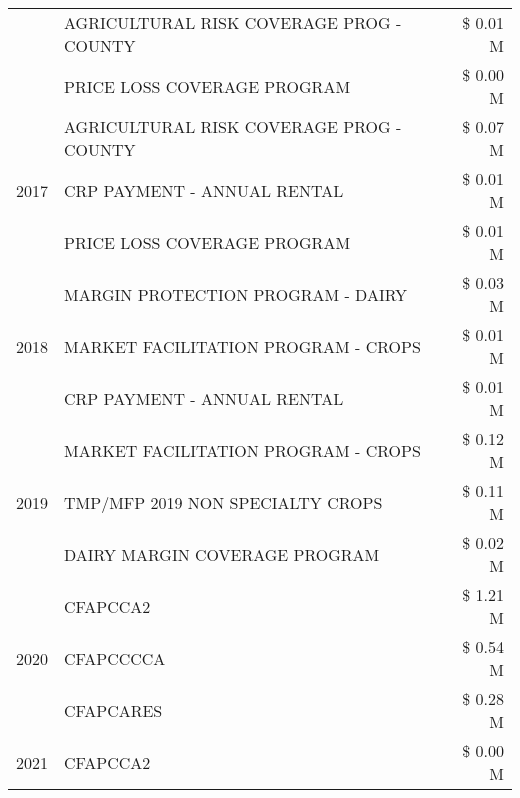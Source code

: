\begin{tabular}{llr}
 & AGRICULTURAL RISK COVERAGE PROG - COUNTY & \$ 0.01 M \\
 & PRICE LOSS COVERAGE PROGRAM & \$ 0.00 M \\
\cline{1-3}
\multirow[t]{3}{*}{2017} & AGRICULTURAL RISK COVERAGE PROG - COUNTY & \$ 0.07 M \\
 & CRP PAYMENT - ANNUAL RENTAL & \$ 0.01 M \\
 & PRICE LOSS COVERAGE PROGRAM & \$ 0.01 M \\
\cline{1-3}
\multirow[t]{3}{*}{2018} & MARGIN PROTECTION PROGRAM - DAIRY & \$ 0.03 M \\
 & MARKET FACILITATION PROGRAM - CROPS & \$ 0.01 M \\
 & CRP PAYMENT - ANNUAL RENTAL & \$ 0.01 M \\
\cline{1-3}
\multirow[t]{3}{*}{2019} & MARKET FACILITATION PROGRAM - CROPS & \$ 0.12 M \\
 & TMP/MFP 2019 NON SPECIALTY CROPS & \$ 0.11 M \\
 & DAIRY MARGIN COVERAGE PROGRAM & \$ 0.02 M \\
\cline{1-3}
\multirow[t]{3}{*}{2020} & CFAPCCA2 & \$ 1.21 M \\
 & CFAPCCCCA & \$ 0.54 M \\
 & CFAPCARES & \$ 0.28 M \\
\cline{1-3}
2021 & CFAPCCA2 & \$ 0.00 M \\
\cline{1-3}
\bottomrule
\end{tabular}
